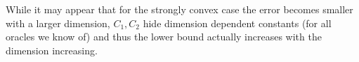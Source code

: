 While it may appear that for the strongly convex case the error becomes smaller with a larger dimension,
$C_1, C_2$ hide dimension dependent constants (for all oracles we know of)
and thus the lower bound actually increases with the dimension increasing.


